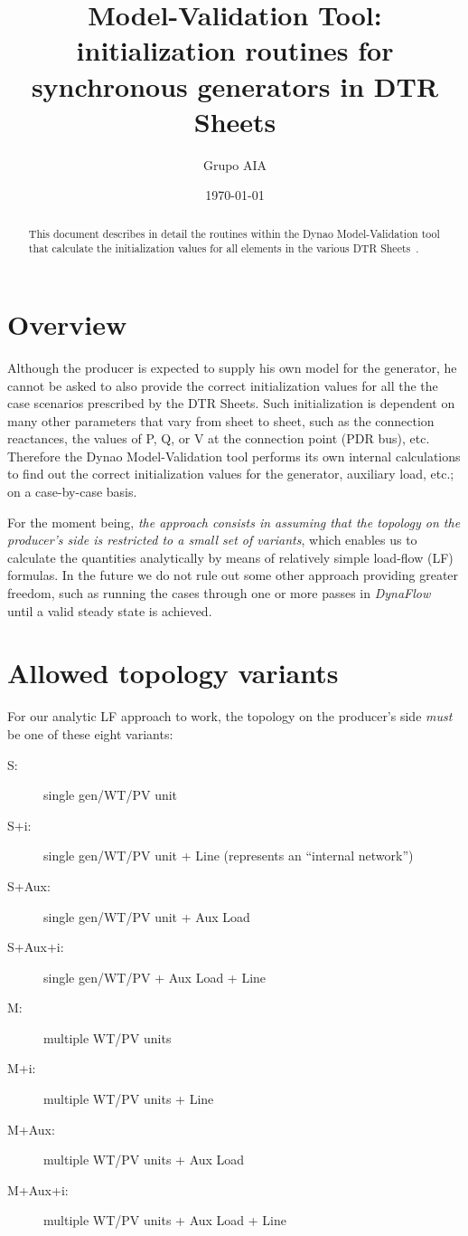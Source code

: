 \documentclass[a4paper,11pt]{article}
\title{\Dynawo{} Model-Validation Tool: initialization routines for synchronous
  generators in DTR Sheets}
\author{Grupo AIA}
\date{
  \today
}
\newcommand{\Dynawo}{Dyna\textomega o} %
\begin{document}
\maketitle
\tableofcontents

\begin{abstract}
  This document describes in detail the routines within the \Dynawo{} Model-Validation
  tool that calculate the initialization values for all elements in the various DTR
  Sheets~\cite{DTRhome}.
\end{abstract}





\section{Overview}

Although the producer is expected to supply his own model for the generator, he cannot
be asked to also provide the correct initialization values for all the the case
scenarios prescribed by the DTR Sheets. Such initialization is dependent on many other
parameters that vary from sheet to sheet, such as the connection reactances, the values
of P, Q, or V at the connection point (PDR bus), etc.  Therefore the \Dynawo{}
Model-Validation tool performs its own internal calculations to find out the correct
initialization values for the generator, auxiliary load, etc.; on a case-by-case basis.

For the moment being, \emph{the approach consists in assuming that the
topology on the producer's side is restricted to a small set of
variants}, which enables us to calculate the quantities analytically
by means of relatively simple load-flow (LF) formulas. In the future
we do not rule out some other approach providing greater freedom, such
as running the cases through one or more passes in
\emph{DynaFlow}~\cite{Dynawo} until a valid steady state is achieved.


\section{Allowed topology variants}

For our analytic LF approach to work, the topology on the producer's side \emph{must} be
one of these eight variants:
\begin{description}
\item[S:] single gen/WT/PV unit
\item [S+i:] single gen/WT/PV unit + Line (represents an ``internal network'')
\item [S+Aux:] single gen/WT/PV unit + Aux Load 
\item [S+Aux+i:] single gen/WT/PV + Aux Load + Line
\item [M:] multiple WT/PV units
\item [M+i:] multiple WT/PV units + Line
\item [M+Aux:] multiple WT/PV units + Aux Load
\item [M+Aux+i:] multiple WT/PV units + Aux Load + Line
\end{description}
\end{document}
